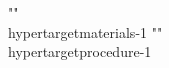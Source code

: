 {{{{{{{{{{{{{{{{{{""\\hypertarget{materials-1}{%
""\\hypertarget{procedure-1}{%
}}}}}}}}}}}}}}}}}}}}
